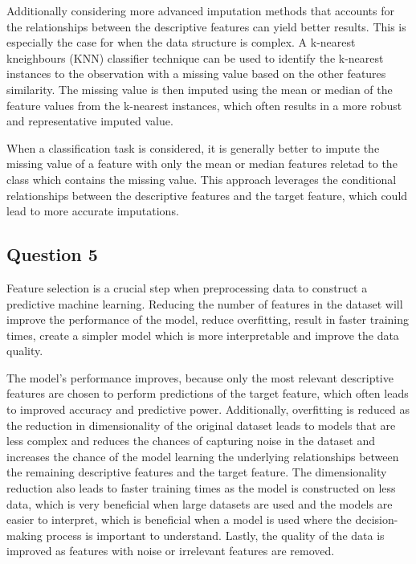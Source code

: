 \documentclass[10pt]{article}
\begin{document}
Additionally considering more advanced imputation methods that accounts for the relationships between
the descriptive features can yield better results. This is especially the case for when the data structure is complex.
A k-nearest kneighbours (KNN) classifier technique can be used to identify the k-nearest instances to the observation with a
missing value based on the other features similarity.
The missing value is then imputed using the mean or median of the feature values from the k-nearest instances, which often results
in a more robust and representative imputed value.

When a classification task is considered, it is generally better to impute the missing value of a feature with only the mean
or median features reletad to the class which contains the missing value. This approach leverages the conditional relationships
between the descriptive features and the target feature, which could lead to more accurate imputations.

\subsection*{Question 5}

Feature selection is a crucial step when preprocessing data to construct a predictive machine learning.
Reducing the number of features in the dataset will improve the performance of the model, reduce overfitting,
result in faster training times, create a simpler model which is more interpretable and improve the data quality.

The model's performance improves, because only the most relevant descriptive features are chosen to perform predictions of
the target feature, which often leads to improved accuracy and predictive power. Additionally, overfitting is reduced as the
reduction in dimensionality of the original dataset leads to models that are less complex and reduces the chances of capturing noise
in the dataset and increases the chance of the model learning the underlying relationships between the remaining descriptive features
and the target feature. The dimensionality reduction also leads to faster training times as the model is constructed on less data, which
is very beneficial when large datasets are used and the models are easier to interpret, which is beneficial when a model is used where
the decision-making process is important to understand. Lastly, the quality of the data is improved as features with noise or irrelevant
features are removed. 
\end{document}
